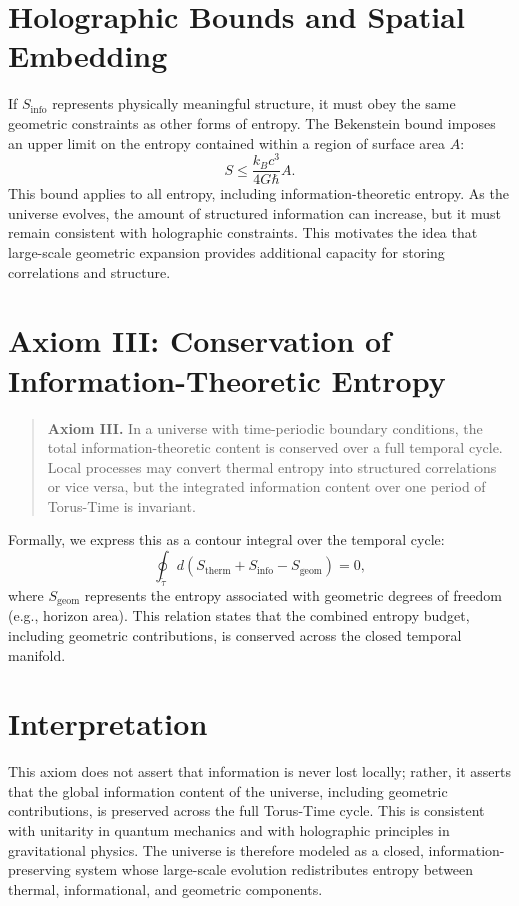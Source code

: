\documentclass[12pt,openany]{book}
\theoremstyle{plain}
\theoremstyle{definition}
\theoremstyle{remark}
\begin{document}
\section{Holographic Bounds and Spatial Embedding}
If $S_{\mathrm{info}}$ represents physically meaningful structure, it must obey
the same geometric constraints as other forms of entropy. The Bekenstein bound
imposes an upper limit on the entropy contained within a region of surface area
$A$:
\[
S \le \frac{k_{B} c^{3}}{4 G \hbar} A.
\]
This bound applies to all entropy, including information-theoretic entropy. As
the universe evolves, the amount of structured information can increase, but it
must remain consistent with holographic constraints. This motivates the idea
that large-scale geometric expansion provides additional capacity for storing
correlations and structure.

\section{Axiom III: Conservation of Information-Theoretic Entropy}
\begin{quote}
\textbf{Axiom III.}  
In a universe with time-periodic boundary conditions, the total
information-theoretic content is conserved over a full temporal cycle. Local
processes may convert thermal entropy into structured correlations or vice
versa, but the integrated information content over one period of Torus-Time is
invariant.
\end{quote}

Formally, we express this as a contour integral over the temporal cycle:
\[
\oint_{\tilde{\tau}} d\!\left(S_{\mathrm{therm}}
  + S_{\mathrm{info}} - S_{\mathrm{geom}}\right) = 0,
\]
where $S_{\mathrm{geom}}$ represents the entropy associated with geometric
degrees of freedom (e.g., horizon area). This relation states that the combined
entropy budget, including geometric contributions, is conserved across the
closed temporal manifold.

\section{Interpretation}
This axiom does not assert that information is never lost locally; rather, it
asserts that the global information content of the universe, including
geometric contributions, is preserved across the full Torus-Time cycle. This is
consistent with unitarity in quantum mechanics and with holographic principles
in gravitational physics. The universe is therefore modeled as a closed,
information-preserving system whose large-scale evolution redistributes entropy
between thermal, informational, and geometric components.
\end{document}
